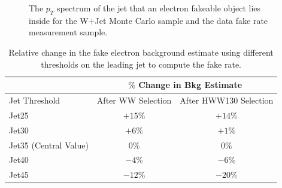 \begin{figure}[!htbp]
\begin{center}
\caption{The $p_{T}$ spectrum of the jet that an electron fakeable object lies inside for the 
W+Jet Monte Carlo sample and the data fake rate measurement sample.}
\label{fig:ele_fr_jetspectrum}
\end{center}
\end{figure}


\begin{table}[!htbp]
\begin{center}
\begin{tabular}{|l|c|c|}
\hline
                        & \multicolumn{2}{|c|}{ $\%$ Change in Bkg Estimate} \\
\hline
Jet Threshold           & After WW Selection  & After HWW130 Selection \\
\hline
Jet25                   &  $+15\%$     & $+14\%$    \\
Jet30                   &  $+6\%$      & $+1\%$     \\
Jet35 (Central Value)   &  $0\%$       & $0\%$      \\
Jet40                   &  $-4\%$      & $-6\%$     \\
Jet45                   &  $-12\%$     & $-20\%$    \\
\hline

\hline
\end{tabular}
\caption{Relative change in the fake electron background estimate using different thresholds on the leading jet to compute the fake rate. }
\label{tab:ele_fr_JetSpectrumSystematics}
\end{center}
\end{table}



